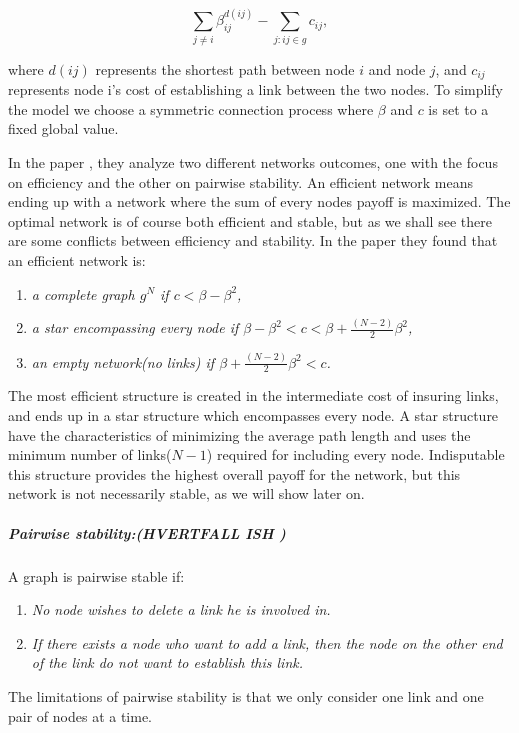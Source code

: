 \begin{equation}
\sum_{j\neq i}^{} \beta_{ij}^{d(ij)} - \sum_{j:ij\in g}^{} {c}_{ij}, 
\label{eq:connecetionGame}
\end{equation}

where $d(ij)$ represents the shortest path between node $i $ and node $j $, and ${c}_{ij}$ represents node i's cost of establishing a link between the two nodes. To simplify the model we choose a symmetric connection process where $\beta$ and $c$ is set to a fixed global value. 

In the paper \cite{jackson1996strategic}, they analyze two different networks outcomes, one with the focus on efficiency and the other on  pairwise stability. An efficient network means ending up with a network where the sum of every nodes payoff is maximized. The optimal network is of course both efficient and stable, but as we shall see there are some conflicts between efficiency and stability. In the paper they found that an efficient network is:
\begin{enumerate}
\item \textit{a complete graph $g^N$ if $c<\beta - \beta^2$,}
\item \textit{a star encompassing every node if $\beta - \beta^2 < c < \beta + \frac{(N-2)}{2}\beta^2$,}
\item \textit{an empty network(no links) if $\beta + \frac{(N-2)}{2}\beta^2 < c$.}
\end{enumerate}

The most efficient structure is created in the intermediate cost of insuring links, and ends up in a star structure which encompasses every node. A star structure have the characteristics of minimizing the average path length and uses the minimum number of links($N-1$) required for including every node. 
Indisputable this structure provides the highest overall payoff for the network, but this network is not necessarily stable, as we will show later on.

\subparagraph{Pairwise stability:(HVERTFALL ISH )}
A graph is pairwise stable if:
 \begin{enumerate}
\item \textit{No node wishes to delete a link he is involved in.}
\item \textit{If there exists a node who want to add a link, then the node on the other end of the link do not want to establish this link.}
\end{enumerate} 
The limitations of pairwise stability is that we only consider one link and one pair of nodes at a time.

